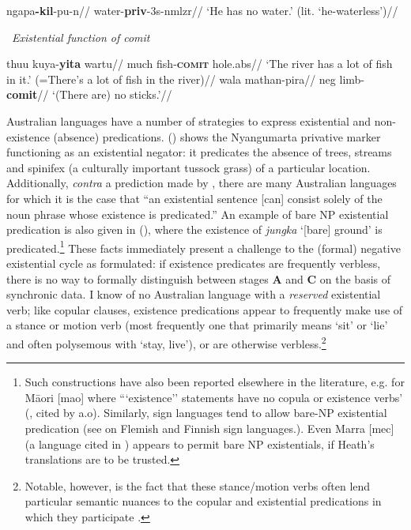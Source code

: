 \documentclass[usenames,dvipsnames,11pt]{article}
\begin{document}
{\a\begingl\gla\rightcomment{[Muruwari]}ngapa\textbf{-kil}-pu-n//
\glb water-\textbf{\gls{priv}}-3s-\gls{nmlzr}//
\glft`He has no water.' (lit. `he-waterless')// \endgl
 \xe

\pex~\textit{Existential function of \gls{comit}}
	
\a\begingl%
	\gla \rightcomment{[Muruwari]}thuu kuya-\textbf{yita} wartu//
	\glb much fish-\textsc{\textbf{comit}} hole.\gls{abs}//
	\glft`The river has a lot of fish in it.' (=There's a lot of fish in the river)//\endgl
	\a\begingl\gla\rightcomment{[Muruwari]}wala mathan-pira//
	\glb \gls{neg} limb-\textbf{\gls{comit}}//
	\glft`(There are) no sticks.'//\endgl
\xe




Australian languages have a number of strategies to express existential and non-existence (absence) predications. () shows the Nyangumarta privative marker functioning as an existential negator: it predicates the absence of trees, streams and spinifex (a culturally important tussock grass) of a particular location. Additionally, \textit{contra} a prediction made by \citet[19]{Croft1991}, there are many Australian languages for which it is the case that ``an existential sentence [can] consist solely of the noun phrase whose existence is predicated.'' An example of bare NP existential predication is also given in (), where the existence of \textit{jungka} `[bare] ground' is predicated.\footnote{Such constructions have also been reported elsewhere in the literature, e.g. for Māori [\gls{mao}] where ```existence'' statements have no copula or existence verbs' (\citealp[78]{Bauer1993}, cited by \citealp{Chung2004} a.o). Similarly, sign languages tend to allow bare-NP existential predication (see \citealt[26ff]{deWeert2016} on Flemish and Finnish sign languages.). Even Marra [\gls{mec}] (a language cited in \citealt[14]{Croft1991}) appears to permit bare NP existentials, if Heath's \citeyearpar[364]{Heath1981} translations are to be trusted.}
 These facts immediately present a challenge to the (formal) negative existential cycle as formulated: if existence predicates are frequently verbless, there is no way to formally distinguish between stages \textbf{A} and \textbf{C} on the basis of synchronic data. I know of no Australian language with a \textit{reserved} existential verb; like copular clauses, existence predications appear to frequently make use of a stance or motion verb (most frequently one that primarily means `sit' or `lie' and often polysemous with `stay, live'), or are otherwise verbless.\footnote{Notable, however, is the fact that these stance/motion verbs often lend particular semantic nuances to the copular and existential predications in which they participate \citep[see e.g. ][610-611]{Wilkinson1991}.}

}
\end{document}
